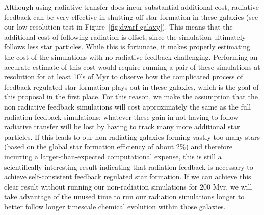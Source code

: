 \documentclass[11pt]{article}
\begin{document}
Although using radiative transfer does incur substantial additional cost, radiative feedback can be very effective in shutting off star formation in these galaxies (see our low resolution test in Figure~\ref{fig:dwarf galaxy}). This means that the additional cost of following radiation is offset, since the simulation ultimately follows less star particles. While this is fortunate, it makes properly estimating the cost of the simulations with no radiative feedback challenging. Performing an accurate estimate of this cost would require running a pair of these simulations at resolution for at least 10's of Myr to observe how the complicated process of feedback regulated star formation plays out in these galaxies, which is the goal of this proposal in the first place. For this reason, we make the assumption that the non radiative feedback simulations will cost approximately the same as the full radiation feedback simulations; whatever these gain in not having to follow radiative transfer will be lost by having to track many more additional star particles. If this leads to our non-radiating galaxies forming vastly too many stars (based on the global star formation efficiency of about 2\%) and therefore incurring a larger-than-expected computational expense, this is still a scientifically interesting result indicating that radiation feedback is necessary to achieve self-consistent feedback regulated star formation. If we can achieve this clear result without running our non-radiation simulations for 200 Myr, we will take advantage of the unused time to run our radiation simulations longer to better follow longer timescale chemical evolution within those galaxies.

\end{document}
